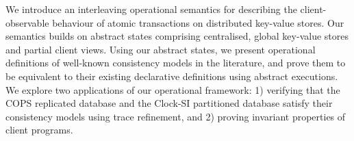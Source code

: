 We introduce an interleaving operational semantics for describing the
client-observable behaviour of atomic transactions on distributed
key-value stores. Our semantics builds on abstract states comprising
centralised, global key-value stores and partial client views. 
Using our abstract states, we present operational definitions of well-known consistency models in the literature, 
and prove them to be equivalent to their existing declarative definitions using abstract executions. 
We explore two applications of our operational framework: 1) verifying that the COPS replicated database
and the Clock-SI  partitioned database satisfy their 
consistency models using trace refinement,
and 2) proving invariant properties of client programs. 
